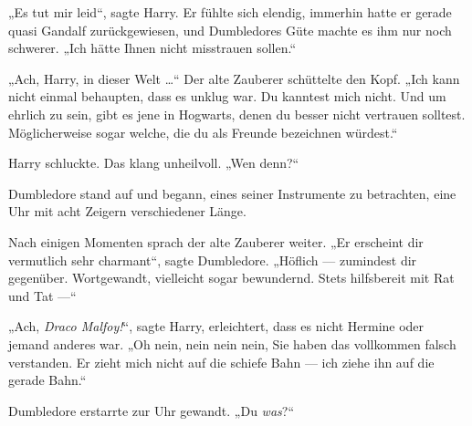 „Es tut mir leid“, sagte Harry. Er fühlte sich elendig, immerhin hatte er gerade quasi Gandalf zurückgewiesen, und Dumbledores Güte machte es ihm nur noch schwerer.
„Ich hätte Ihnen nicht misstrauen sollen.“

„Ach, Harry, in dieser Welt …“ Der alte Zauberer schüttelte den Kopf.
„Ich kann nicht einmal behaupten, dass es unklug war. Du kanntest mich nicht. Und um ehrlich zu sein, gibt es jene in Hogwarts, denen du besser nicht vertrauen solltest. Möglicherweise sogar welche, die du als Freunde bezeichnen würdest.“

Harry schluckte. Das klang unheilvoll.
„Wen denn?“

Dumbledore stand auf und begann, eines seiner Instrumente zu betrachten, eine Uhr mit acht Zeigern verschiedener Länge.

Nach einigen Momenten sprach der alte Zauberer weiter.
„Er erscheint dir vermutlich sehr charmant“, sagte Dumbledore.
„Höflich — zumindest dir gegenüber. Wortgewandt, vielleicht sogar bewundernd. Stets hilfsbereit mit Rat und Tat —“

„Ach, \emph{Draco Malfoy!}“, sagte Harry, erleichtert, dass es nicht Hermine oder jemand anderes war.
„Oh nein, nein nein nein, Sie haben das vollkommen falsch verstanden. Er zieht mich nicht auf die schiefe Bahn — ich ziehe ihn auf die gerade Bahn.“

Dumbledore erstarrte zur Uhr gewandt.
„Du \emph{was}?“

